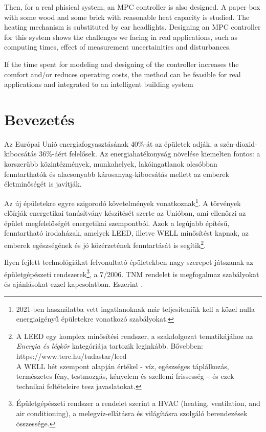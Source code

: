Then, for a real phisical system, an MPC controller is also designed. A paper box with some wood and some brick with reasonable heat capacity is studied. The heating mechanism is substituted by car headlights. 
Designing an MPC controller for this system shows the challenges we facing in real applications, such as computing times, effect of measurement uncertainities and disturbances.

If the time spent for modeling and designing of the controller increases the comfort and/or reduces operating costs, the method can be feasible for real applications and integrated to an intelligent building system


\chapter{Bevezetés}
Az Európai Unió energiafogyasztásának 40\%-át az épületek adják, a szén-dioxid-kibocsátás 36\%-áért felelősek. Az energiahatékonyság növelése kiemelten fontos: a korszerűbb közintézmények, munkahelyek, lakóingatlanok olcsóbban fenntarthatók és alacsonyabb károsanyag-kibocsátás mellett az emberek életminőségét is javítják.

Az új épületekre egyre szigorodó követelmények vonatkoznak\footnote{2021-ben használatba vett ingatlanoknak már teljesíteniük kell a közel nulla energiaigényű épületekre \cite{NZEB} vonatkozó szabályokat. }.
A törvények előírják energetikai tanúsítvány készítését szerte az Unióban, ami ellenőrzi az épület megfelelőségét energetikai szempontból.
Azok a legújabb építésű, fenntartható irodaházak, amelyek LEED, illetve WELL minősítést kapnak, az emberek egészségének és jó közérzetének fenntartását is segítik\footnote{A LEED egy komplex minősítési rendszer, a szakdolgozat tematikájához az \textit{Energia és légkör} kategóriája tartozik leginkább. Bővebben: https://www.terc.hu/tudastar/leed \\
A WELL hét szempont alapján értékel - víz, egészséges táplálkozás, természetes fény, testmozgás, kényelem és szellemi frissesség ‒ és ezek technikai feltételeire tesz javaslatokat.}.

Ilyen fejlett technológiákat felvonultató épületekben nagy szerepet játszanak az épületgépészeti rendszerek\footnote{Épületgépészeti rendszer a \cite{TNM2006} rendelet szerint a  HVAC (heating, ventilation, and air conditioning), a melegvíz-ellátásra és világításra szolgáló berendezések összessége.},
a 7/2006. TNM rendelet \cite{TNM2006} is megfogalmaz szabályokat és ajánlásokat ezzel kapcsolatban. Eszerint .
	
